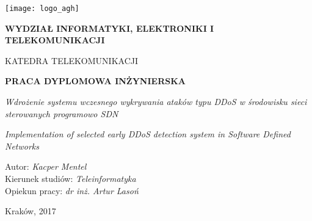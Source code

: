 \newpage
\thispagestyle{empty}
\mbox{}
    \begin{center}
        \texttt{[image: logo\_agh]}
        \vspace*{0.5cm}
        
        \normalsize
        \textbf{WYDZIAŁ INFORMATYKI, ELEKTRONIKI I TELEKOMUNIKACJI}
        
        \vspace{0.5cm}
        \small
        KATEDRA TELEKOMUNIKACJI

        \vspace{1.5cm}
        \Large
        \textbf{PRACA DYPLOMOWA INŻYNIERSKA}

        \vspace{0.8cm}
        \large
        \textit{Wdrożenie systemu wczesnego wykrywania ataków typu DDoS w środowisku
        sieci sterowanych programowo SDN}

        \vspace{0.5cm}
        \small
        \textit{Implementation of selected early DDoS detection system in
          Software Defined Networks}

      \end{center}

        \vfill
        
        \noindent
        Autor: \hspace{4cm}\textit{Kacper Mentel}\\
        Kierunek studiów: \hspace{1.9cm}\textit{Teleinformatyka}\\
        Opiekun pracy: \hspace{2.4cm}\textit{dr inż. Artur Lasoń}\\

      \begin{center}
        Kraków, 2017
      \end{center}